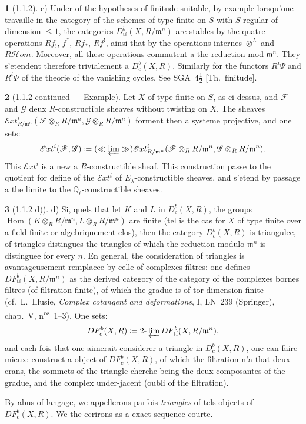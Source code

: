 \documentclass[12pt,a4paper]{article}
\theoremstyle{plain}
\theoremstyle{definition}
\theoremstyle{definition}
\newtheorem{para}{}[section]
\theoremstyle{remark}
\DeclareMathOperator{\Hom}{Hom}
\newcommand{\limproj}{\varprojlim}
\begin{document}
\begin{para}[1.1.2]
c) Under of the hypotheses of finitude suitable, by example lorsqu'one travaille in the category of the schemes of type finite on $S$ with $S$ regular of dimension $\leq 1$, the categories $D^b_{\text{tf}}(X, R/\mathfrak{m}^n)$ are stables by the quatre operations $Rf_!$, $f^*$, $Rf_*$, $Rf^!$, ainsi that by the operations internes $\otimes^L$ and $R\mathscr{H}om$. Moreover, all these operations commutent a the reduction mod $\mathfrak{m}^n$. They s'etendent therefore trivialement a $D^b_c(X, R)$. Similarly for the functors $R^i \Psi$ and $R^i \Phi$ of the theorie of the vanishing cycles. See SGA~$4\frac{1}{2}$ [Th.~finitude].
\end{para}

\begin{para}[1.1.2 continued --- Example]
Let $X$ of type finite on $S$, as ci-dessus, and $\mathscr{F}$ and $\mathscr{G}$ deux $R$-constructible sheaves without twisting on $X$. The sheaves $\mathscr{E}xt^i_{R/\mathfrak{m}^n}(\mathscr{F} \otimes_R R/\mathfrak{m}^n, \mathscr{G} \otimes_R R/\mathfrak{m}^n)$ forment then a systeme projective, and one sets:
\[\mathscr{E}xt^i(\mathscr{F}, \mathscr{G}) \coloneqq (\ll \limproj \gg) \mathscr{E}xt^i_{R/\mathfrak{m}^n}(\mathscr{F} \otimes_R R/\mathfrak{m}^n, \mathscr{G} \otimes_R R/\mathfrak{m}^n).\]
This $\mathscr{E}xt^i$ is a new a $R$-constructible sheaf. This construction passe to the quotient for define of the $\mathscr{E}xt^i$ of $E_\lambda$-constructible sheaves, and s'etend by passage a the limite to the $\overline{\mathbb{Q}}_\ell$-constructible sheaves.
\end{para}

\begin{para}[1.1.2 d)]
d) Si, quels that let $K$ and $L$ in $D^b_c(X, R)$, the groups $\Hom(K \otimes_R R/\mathfrak{m}^n, L \otimes_R R/\mathfrak{m}^n)$ are finite (tel is the cas for $X$ of type finite over a field finite or algebriquement clos), then the category $D^b_c(X, R)$ is triangulee, of triangles distingues the triangles of which the reduction modulo $\mathfrak{m}^n$ is distinguee for every $n$. En general, the consideration of triangles is avantageusement remplacee by celle of complexes filtres: one defines $DF^b_{\text{tf}}(X, R/\mathfrak{m}^n)$ as the derived category of the category of the complexes bornes filtres (of filtration finite), of which the gradue is of tor-dimension finite (cf.~L.~Illusie, \emph{Complex cotangent and deformations}, I, LN~239 (Springer), chap.~V, n\textsuperscript{os}~1--3). One sets:
\[DF^b_c(X, R) \coloneqq 2\text{-}\limproj DF^b_{\text{tf}}(X, R/\mathfrak{m}^n),\]
and each fois that one aimerait considerer a triangle in $D^b_c(X, R)$, one can faire mieux: construct a object of $DF^b_c(X, R)$, of which the filtration n'a that deux crans, the sommets of the triangle cherche being the deux composantes of the gradue, and the complex under-jacent (oubli of the filtration).

By abus of langage, we appellerons parfois \emph{triangles} of tels objects of $DF^b_c(X, R)$. We the ecrirons as a exact sequence courte.
\end{para}
\end{document}
